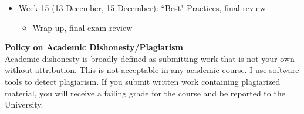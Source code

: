 \documentclass[12pt]{article}
\begin{document}
\begin{itemize}
\item Week 15 (13 December, 15 December): ``Best" Practices, final review
\begin{itemize}
\item Wrap up, final exam review
\end{itemize}
\end{itemize}


\noindent \Large \textbf{Policy on Academic Dishonesty/Plagiarism}\normalsize\\

\noindent Academic dishonesty is broadly defined as submitting work that is not your own without attribution. This is not acceptable in any academic course. I use software tools to detect plagiarism. If you submit written work containing plagiarized material, you will receive a failing grade for the course and be reported to the University.\\
\end{document}
